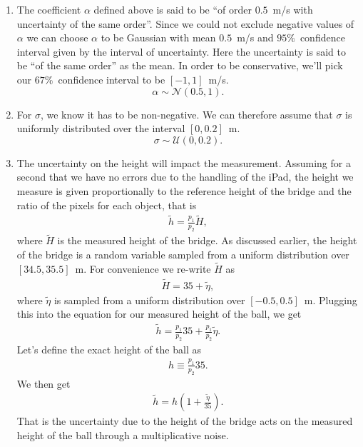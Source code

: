 \documentclass{article}
\begin{document}
\begin{enumerate}
 \item The coefficient $\alpha$ defined above is said to be ``of order
       $0.5$~m/s with uncertainty of the same order''.  
 Since we could not exclude negative values of $\alpha$ we can choose
       $\alpha$ to be Gaussian with mean $0.5$~m/s and $95\%$~confidence
       interval given by the interval of uncertainty. Here the
       uncertainty is said to be ``of the same order'' as the mean. In
       order to be conservative, we'll pick our $67\%$~confidence
       interval to be $[-1,1]$~m/s.  
\[ \alpha \sim \mathcal{N}(0.5, 1). \]
 \item For $\sigma$, we know it has to be non-negative. We can therefore
       assume that $\sigma$ is uniformly distributed over the interval
       $[0, 0.2]$~m. 
\[ \sigma \sim \mathcal{U}(0, 0.2) . \] 
 \item The uncertainty on the height will impact the
       measurement. Assuming for a second that we have no errors due to
       the handling of the iPad, the height we measure is given
       proportionally to the reference height of the bridge and the
       ratio of the pixels for each object, that is 
 \begin{align*}
  \tilde{h} = \frac{p_1}{p_2} \tilde{H},
 \end{align*}
where $\tilde{H}$ is the measured height of the bridge. As discussed
       earlier, the height of the bridge is a random variable sampled
       from a uniform distribution over $[34.5, 35.5]$~m. 
For convenience we re-write $\tilde{H}$ as
\begin{align*}
 \tilde{H} = 35 + \tilde{\eta},
\end{align*}
where $\tilde{\eta}$ is sampled from a uniform distribution over $[-0.5,
       0.5]$~m. Plugging this into the equation for our measured height
       of the ball, we get 
\begin{align*}
 \tilde{h} = \frac{p_1}{p_2} 35 + \frac{p_1}{p_2} \tilde{\eta}. 
\end{align*}
Let's define the exact height of the ball as 
\begin{align*}
 h \equiv \frac{p_1}{p_2} 35.
\end{align*}
We then get
\begin{align*}
 \tilde{h} = h \left( 1 + \frac{\tilde{\eta}}{35} \right).
\end{align*}
That is the uncertainty due to the height of the bridge acts on the
       measured height of the ball through a multiplicative noise.  

\end{enumerate}
\end{document}

